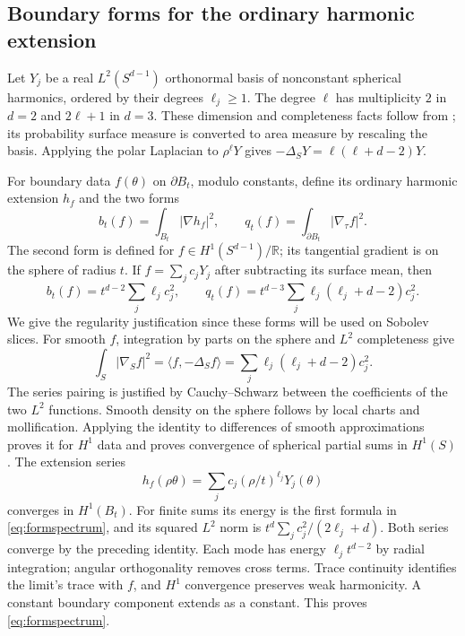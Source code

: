 \documentclass[11pt]{article}
\theoremstyle{remark}
\newcommand{\R}{\mathbb R}
\begin{document}
\subsection{Boundary forms for the ordinary harmonic extension}
Let $Y_j$ be a real $L^2(S^{d-1})$ orthonormal basis of nonconstant
spherical harmonics, ordered by their degrees $\ell_j\ge1$. The degree
$\ell$ has multiplicity $2$ in $d=2$ and $2\ell+1$ in $d=3$.
These dimension and completeness facts follow from
\cite[Proposition 5.8 and Theorem 5.12]{Axler2001}; its probability
surface measure is converted to area measure by rescaling the basis.
Applying the polar Laplacian to $\rho^\ell Y$ gives
$-\Delta_S Y=\ell(\ell+d-2)Y$.

For boundary data $f(\theta)$ on $\partial B_t$, modulo constants,
define its ordinary harmonic extension $h_f$ and the two forms
\begin{equation}\label{eq:boundaryforms}
 b_t(f)=\int_{B_t}|\nabla h_f|^2,\qquad
 q_t(f)=\int_{\partial B_t}|\nabla_\tau f|^2.
\end{equation}
The second form is defined for $f\in H^1(S^{d-1})/\R$; its
tangential gradient is on the sphere of radius $t$. If
$f=\sum_j c_jY_j$ after subtracting its surface mean, then
\begin{equation}\label{eq:formspectrum}
 b_t(f)=t^{d-2}\sum_j\ell_jc_j^2,\qquad
 q_t(f)=t^{d-3}\sum_j\ell_j(\ell_j+d-2)c_j^2.
\end{equation}
We give the regularity justification since these forms will be used
on Sobolev slices. For smooth $f$, integration by parts on the
sphere and $L^2$ completeness give
\[
 \int_S|\nabla_S f|^2=\langle f,-\Delta_S f\rangle
        =\sum_j\ell_j(\ell_j+d-2)c_j^2.
\]
The series pairing is justified by Cauchy--Schwarz between the coefficients
of the two $L^2$ functions. Smooth density on the sphere follows by local
charts and mollification. Applying the identity to differences of smooth
approximations proves it for $H^1$ data and proves convergence of spherical
partial sums in $H^1(S)$. The extension series
\[
 h_f(\rho\theta)=\sum_j c_j(\rho/t)^{\ell_j}Y_j(\theta)
\]
converges in $H^1(B_t)$. For finite sums its energy is the first
formula in \eqref{eq:formspectrum}, and its squared $L^2$ norm is
$t^d\sum_j c_j^2/(2\ell_j+d)$. Both series converge by the preceding
identity. Each mode has energy $\ell_jt^{d-2}$ by radial integration;
angular orthogonality removes cross terms. Trace continuity identifies
the limit's trace with $f$, and $H^1$ convergence preserves weak
harmonicity. A constant boundary component extends as a constant.
This proves \eqref{eq:formspectrum}.
\end{document}
